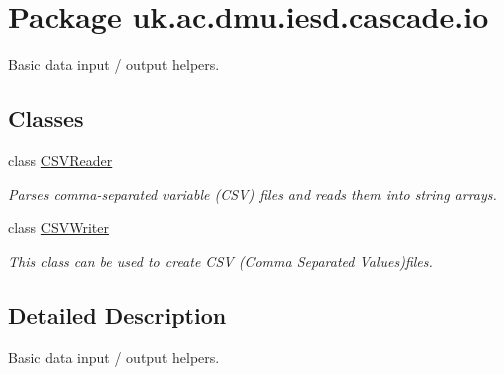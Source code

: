 \hypertarget{namespaceuk_1_1ac_1_1dmu_1_1iesd_1_1cascade_1_1io}{\section{Package uk.\-ac.\-dmu.\-iesd.\-cascade.\-io}
\label{namespaceuk_1_1ac_1_1dmu_1_1iesd_1_1cascade_1_1io}
}


Basic data input / output helpers.  


\subsection*{Classes}
\begin{DoxyCompactItemize}
\item 
class \hyperlink{classuk_1_1ac_1_1dmu_1_1iesd_1_1cascade_1_1io_1_1_c_s_v_reader}{C\-S\-V\-Reader}
\begin{DoxyCompactList}\small\item\em Parses comma-\/separated variable (C\-S\-V) files and reads them into string arrays. \end{DoxyCompactList}\item 
class \hyperlink{classuk_1_1ac_1_1dmu_1_1iesd_1_1cascade_1_1io_1_1_c_s_v_writer}{C\-S\-V\-Writer}
\begin{DoxyCompactList}\small\item\em This class can be used to create C\-S\-V (Comma Separated Values)files. \end{DoxyCompactList}\end{DoxyCompactItemize}


\subsection{Detailed Description}
Basic data input / output helpers. 
